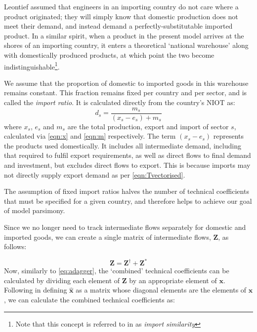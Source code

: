 \documentclass[a4paper]{article}
\begin{document}
Leontief assumed that engineers in an importing country do not care where a product originated; they will simply know that domestic production does not meet their demand, and instead demand a perfectly-substitutable imported product.
In a similar spirit, when a product in the present model arrives at the shores of an importing country, it enters a theoretical `national warehouse' along with domestically produced products, at which point the two become indistinguishable\footnote{Note that this concept is referred to in \textcite{miller_input-output_1985} as \textit{import similarity}}.

We assume that the proportion of domestic to imported goods in this warehouse remains constant.
This fraction remains fixed per country and per sector, and is called the \textit{import ratio}. It is calculated directly from the country's NIOT as:
\begin{equation}\label{eqn:importratio}
d_s = \frac{m_s}{(x_s - e_s ) + m_s}
\end{equation}
where $x_s$, $e_s$ and $m_s$ are the total production, export and import of sector $s$, calculated via \cref{eqn:x} and \cref{eqn:m} respectively.
The term $(x_s - e_s )$ represents the products used domestically.
It includes all intermediate demand, including that required to fulfil export requirements, as well as direct flows to final demand and investment, but excludes direct flows to export.
This is because imports may not directly supply export demand as per \cref{eqn:Tvectorised}.

The assumption of fixed import ratios halves the number of technical coefficients that must be specified for a given country, and therefore helps to achieve our goal of model parsimony.

Since we no longer need to track intermediate flows separately for domestic and imported goods, we can create a single matrix of intermediate flows, $\boldsymbol{Z}$, as follows:

\begin{equation}
    \boldsymbol{Z} = \boldsymbol{Z}^{\dagger} + \boldsymbol{Z}^{*}
\end{equation}
Now, similarly to \cref{eq:adagger}, the `combined' technical coefficients can be calculated by dividing each element of $\boldsymbol{Z}$ by an appropriate element of $\boldsymbol{x}$.
Following \textcite{miller_input-output_1985} in defining $\boldsymbol{\hat{x}}$ as a matrix whose diagonal elements are the elements of $\boldsymbol{x}$, we can calculate the combined technical coefficients as:
\end{document}
